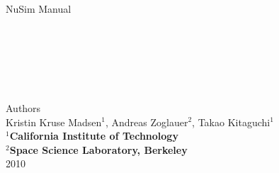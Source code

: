 %
\pagestyle{empty}
\begin{centering}
  \huge{NuSim Manual} \\
\begin{verbatim}



\end{verbatim}

\begin{figure}[h]
\end{figure}
\begin{verbatim}



\end{verbatim}

\large{Authors}\\
\large{Kristin Kruse Madsen$^1$, Andreas Zoglauer$^2$, Takao Kitaguchi$^1$}\\


\normalsize{\textbf{$^1$California Institute of Technology}\\
\textbf{$^2$Space Science Laboratory, Berkeley}}\\
2010\\

\end{centering}
%
